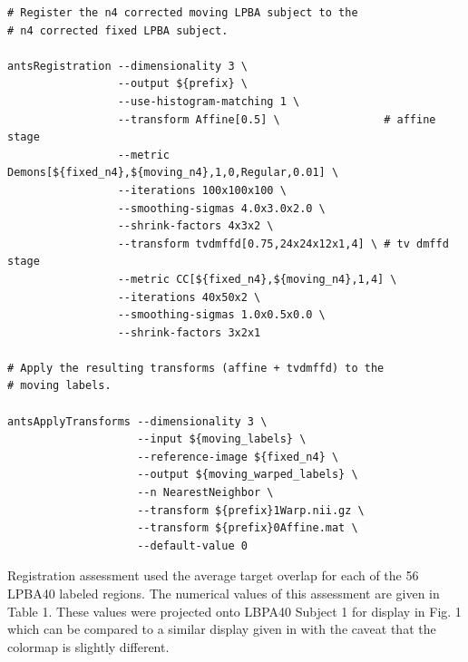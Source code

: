 \documentclass{llncs}
\begin{document}
\vspace{2mm}
\begin{lstlisting}
# Register the n4 corrected moving LPBA subject to the 
# n4 corrected fixed LPBA subject.

antsRegistration --dimensionality 3 \
                 --output ${prefix} \
                 --use-histogram-matching 1 \
                 --transform Affine[0.5] \                # affine stage
                 --metric Demons[${fixed_n4},${moving_n4},1,0,Regular,0.01] \ 
                 --iterations 100x100x100 \
                 --smoothing-sigmas 4.0x3.0x2.0 \
                 --shrink-factors 4x3x2 \
                 --transform tvdmffd[0.75,24x24x12x1,4] \ # tv dmffd stage
                 --metric CC[${fixed_n4},${moving_n4},1,4] \ 
                 --iterations 40x50x2 \
                 --smoothing-sigmas 1.0x0.5x0.0 \
                 --shrink-factors 3x2x1

# Apply the resulting transforms (affine + tvdmffd) to the 
# moving labels.
                   
antsApplyTransforms --dimensionality 3 \
                    --input ${moving_labels} \
                    --reference-image ${fixed_n4} \
                    --output ${moving_warped_labels} \
                    --n NearestNeighbor \
                    --transform ${prefix}1Warp.nii.gz \
                    --transform ${prefix}0Affine.mat \
                    --default-value 0
\end{lstlisting}

Registration assessment used the average target overlap 
\cite{tustison2009a} for each of the 56 LPBA40 labeled regions.
The numerical values of this assessment are given in Table 1.
These values were projected onto LBPA40 Subject 1 for display in Fig. 1
which can be compared to a similar display given in \cite{Klein2009}
with the caveat that the colormap is slightly different. 
\end{document}
